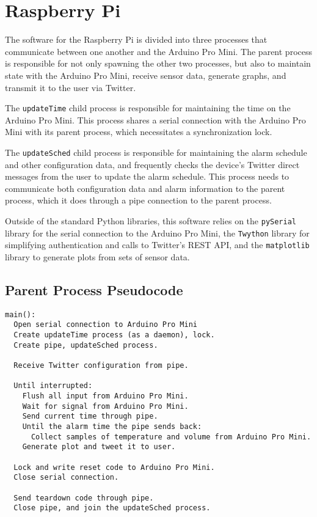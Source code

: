 \section{Raspberry Pi}
The software for the Raspberry Pi is divided into three processes that
communicate between one another and the Arduino Pro Mini. The parent
process is responsible for not only spawning the other two processes,
but also to maintain state with the Arduino Pro Mini, receive sensor
data, generate graphs, and transmit it to the user via Twitter.

The \texttt{updateTime} child process is responsible for maintaining
the time on the Arduino Pro Mini. This process shares a serial
connection with the Arduino Pro Mini with its parent process, which
necessitates a synchronization lock.

The \texttt{updateSched} child process is responsible for maintaining
the alarm schedule and other configuration data, and frequently checks
the device's Twitter direct messages from the user to update the alarm
schedule. This process needs to communicate both configuration data
and alarm information to the parent process, which it does through a
pipe connection to the parent process.

Outside of the standard Python libraries, this software relies on the
\verb|pySerial| library for the serial connection to the Arduino Pro
Mini, the \verb|Twython| library for simplifying authentication and
calls to Twitter's REST API, and the \verb|matplotlib| library to
generate plots from sets of sensor data.

\subsection{Parent Process Pseudocode}
\begin{verbatim}
main():
  Open serial connection to Arduino Pro Mini
  Create updateTime process (as a daemon), lock.
  Create pipe, updateSched process.

  Receive Twitter configuration from pipe.

  Until interrupted:
    Flush all input from Arduino Pro Mini.
    Wait for signal from Arduino Pro Mini.
    Send current time through pipe.
    Until the alarm time the pipe sends back:
      Collect samples of temperature and volume from Arduino Pro Mini.
    Generate plot and tweet it to user.

  Lock and write reset code to Arduino Pro Mini.
  Close serial connection.

  Send teardown code through pipe.
  Close pipe, and join the updateSched process.
\end{verbatim}

